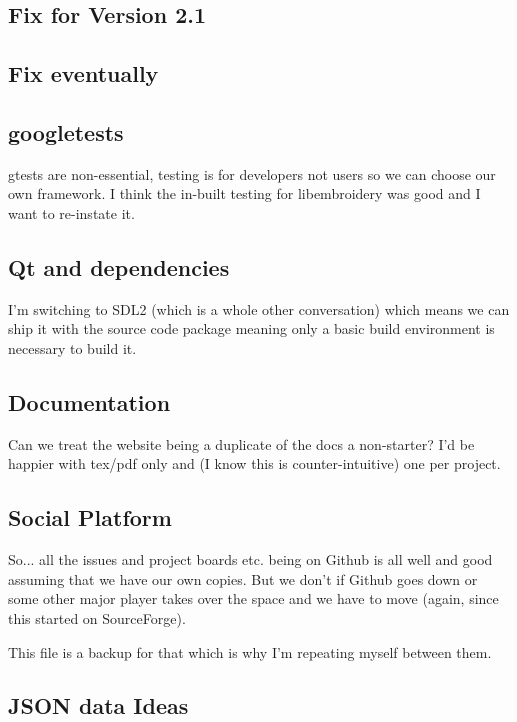 \documentclass[a4paper]{report}
\begin{document}
{{{{{{\subsection{Fix for Version 2.1}

\subsection{Fix eventually}

\subsection{googletests}

gtests are non-essential, testing is for developers not users so we can
choose our own framework. I think the in-built testing for libembroidery
was good and I want to re-instate it.

\subsection{Qt and dependencies}

I'm switching to SDL2 (which is a whole other conversation) which means
we can ship it with the source code package meaning only a basic build
environment is necessary to build it.

\subsection{Documentation}

Can we treat the website being a duplicate of the docs a non-starter?
I'd be happier with tex/pdf only and (I know this is counter-intuitive)
one per project.

\subsection{Social Platform}

So... all the issues and project boards etc. being on Github is all well and good assuming that we have our own copies. But we don't if Github goes down or some other major player takes over the space and we have to move (again, since this started on SourceForge).

This file is a backup for that which is why I'm repeating myself between them.

\subsection{JSON data Ideas}

}}}}}}
\end{document}
